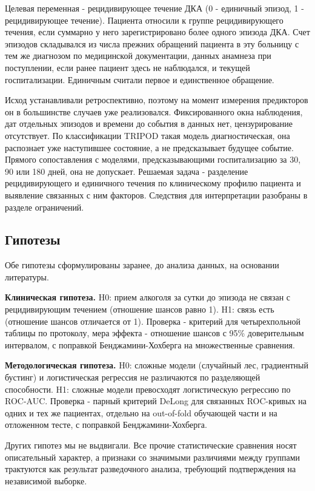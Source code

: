 \documentclass[pdflatex,sn-basic,Numbered]{sn-jnl}
\begin{document}
Целевая переменная - рецидивирующее течение ДКА (0 - единичный эпизод, 1 - рецидивирующее течение). Пациента относили к группе рецидивирующего течения, если суммарно у него зарегистрировано более одного эпизода ДКА. Счет эпизодов складывался из числа прежних обращений пациента в эту больницу с тем же диагнозом по медицинской документации, данных анамнеза при поступлении, если ранее пациент здесь не наблюдался, и текущей госпитализации. Единичным считали первое и единственное обращение.

Исход устанавливали ретроспективно, поэтому на момент измерения предикторов он в большинстве случаев уже реализовался. Фиксированного окна наблюдения, дат отдельных эпизодов и времени до события в данных нет, цензурирование отсутствует. По классификации TRIPOD такая модель диагностическая, она распознает уже наступившее состояние, а не предсказывает будущее событие. Прямого сопоставления с моделями, предсказывающими госпитализацию за 30, 90 или 180 дней, она не допускает. Решаемая задача - разделение рецидивирующего и единичного течения по клиническому профилю пациента и выявление связанных с ним факторов. Следствия для интерпретации разобраны в разделе ограничений.

\subsection{Гипотезы}\label{subsec2_3}

Обе гипотезы сформулированы заранее, до анализа данных, на основании литературы.

\textbf{Клиническая гипотеза.} H0: прием алкоголя за сутки до эпизода не связан с рецидивирующим течением (отношение шансов равно 1). H1: связь есть (отношение шансов отличается от 1). Проверка - критерий для четырехпольной таблицы по протоколу, мера эффекта - отношение шансов с 95\% доверительным интервалом, с поправкой Бенджамини-Хохберга на множественные сравнения.

\textbf{Методологическая гипотеза.} H0: сложные модели (случайный лес, градиентный бустинг) и логистическая регрессия не различаются по разделяющей способности. H1: сложные модели превосходят логистическую регрессию по ROC-AUC. Проверка - парный критерий DeLong для связанных ROC-кривых на одних и тех же пациентах, отдельно на out-of-fold обучающей части и на отложенном тесте, с поправкой Бенджамини-Хохберга.

Других гипотез мы не выдвигали. Все прочие статистические сравнения носят описательный характер, а признаки со значимыми различиями между группами трактуются как результат разведочного анализа, требующий подтверждения на независимой выборке.
\end{document}
